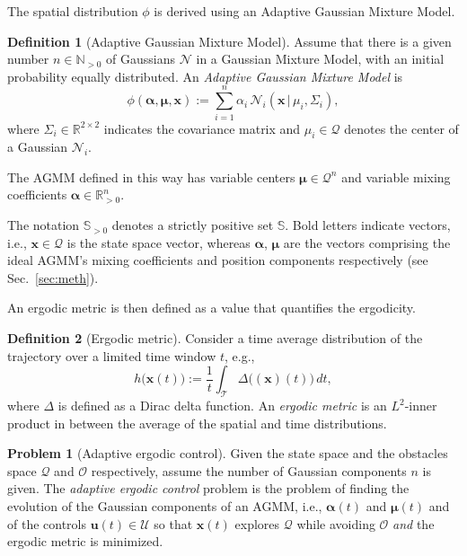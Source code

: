 \documentclass[letterpaper, 10 pt, conference, twoside]{IEEEtran}
\theoremstyle{definition}
\newtheorem{defn}{Definition}[section]
\newtheorem{pb}{Problem}[section]
\begin{document}
The spatial distribution $\phi$ is derived using an Adaptive Gaussian Mixture Model.
\begin{defn}[Adaptive Gaussian Mixture Model]\label{def:movement}
  Assume that there is a given number $n\in\mathbb{N}_{>0}$ of Gaussians $\mathcal{N}$ in a Gaussian Mixture Model, with an initial probability equally distributed. An \textit{Adaptive Gaussian Mixture Model} is \begin{equation}
    \phi(\boldsymbol{\alpha},\boldsymbol{\mu},\mathbf{x}):=\sum_{i=1}^n{\alpha_i\,\mathcal{N}_i(\mathbf{x}\,|\,\mu_i,\Sigma_i)},
  \end{equation}
  where $\Sigma_i\in\mathbb{R}^{2\times 2}$ indicates the covariance matrix and $\mu_i\in\mathcal{Q}$ denotes the center of a Gaussian $\mathcal{N}_i$. 
\end{defn}

The AGMM defined in this way has variable centers $\boldsymbol{\mu}\in\mathcal{Q}^n$ and variable mixing coefficients $\boldsymbol{\alpha}\in\mathbb{R}_{>0}^n$.

The notation $\mathbb{S}_{>0}$ denotes a strictly positive set $\mathbb{S}$. Bold letters indicate vectors, i.e., $\mathbf{x}\in\mathcal{Q}$ is the state space vector, whereas $\boldsymbol{\alpha}$, $\boldsymbol{\mu}$  are the vectors comprising the ideal AGMM's mixing coefficients and position components respectively (see Sec.~\ref{sec:meth}).

An ergodic metric is then defined as a value that quantifies the ergodicity.
\begin{defn}[Ergodic metric]\label{def:ergomet}
  Consider a time average distribution of the trajectory over a limited time window $t$, e.g.,
  \begin{equation}
    h\big(\mathbf{x}(t)\big):=\frac{1}{t}\int_\mathcal{T}\Delta\big((\mathbf{x})(t)\big)\,dt,
  \end{equation}
  where $\Delta$ is defined as a Dirac delta function. An \textit{ergodic metric} is an $L^2$-inner product in between the average of the spatial and time distributions.
\end{defn}

\begin{pb}[Adaptive ergodic control]\label{pb}
  Given the state space and the obstacles space $\mathcal{Q}$ and $\mathcal{O}$ respectively, assume the number of Gaussian components $n$ is given. The \textit{adaptive ergodic control} problem is the problem of finding the evolution of the Gaussian components of an AGMM, i.e., $\boldsymbol{\alpha}(t)$ and $\boldsymbol{\mu}(t)$ and of the controls $\mathbf{u}(t)\in\mathcal{U}$ so that $\mathbf{x}(t)$ explores $\mathcal{Q}$ while avoiding $\mathcal{O}$ \textit{and} the ergodic metric is minimized.
\end{pb}
\end{document}
